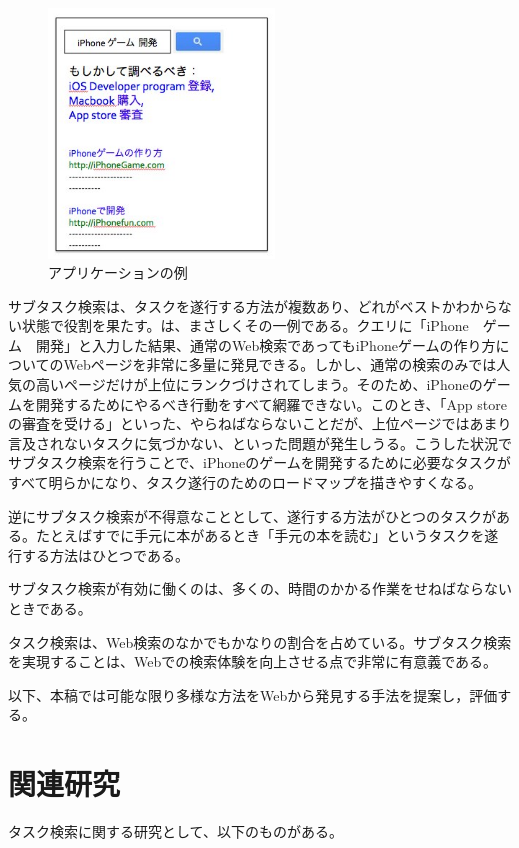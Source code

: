 \documentclass[submit,techreq]{ipsj}
\begin{document}
\begin{figure}[tb]
\includegraphics[width=6cm, bb=0 0 240 400]{future_app.jpg}
\caption{アプリケーションの例}
\label{fig:future_app}
\end{figure}

サブタスク検索は、タスクを遂行する方法が複数あり、どれがベストかわからない状態で役割を果たす。は、まさしくその一例である。クエリに「iPhone　ゲーム　開発」と入力した結果、通常のWeb検索であってもiPhoneゲームの作り方についてのWebページを非常に多量に発見できる。しかし、通常の検索のみでは人気の高いページだけが上位にランクづけされてしまう。そのため、iPhoneのゲームを開発するためにやるべき行動をすべて網羅できない。このとき、「App storeの審査を受ける」といった、やらねばならないことだが、上位ページではあまり言及されないタスクに気づかない、といった問題が発生しうる。こうした状況でサブタスク検索を行うことで、iPhoneのゲームを開発するために必要なタスクがすべて明らかになり、タスク遂行のためのロードマップを描きやすくなる。

逆にサブタスク検索が不得意なこととして、遂行する方法がひとつのタスクがある。たとえばすでに手元に本があるとき「手元の本を読む」というタスクを遂行する方法はひとつである。

サブタスク検索が有効に働くのは、多くの、時間のかかる作業をせねばならないときである。


タスク検索は、Web検索のなかでもかなりの割合を占めている。サブタスク検索を実現することは、Webでの検索体験を向上させる点で非常に有意義である。

以下、本稿では可能な限り多様な方法をWebから発見する手法を提案し，評価する。


\section{関連研究}

タスク検索に関する研究として、以下のものがある。
\end{document}
